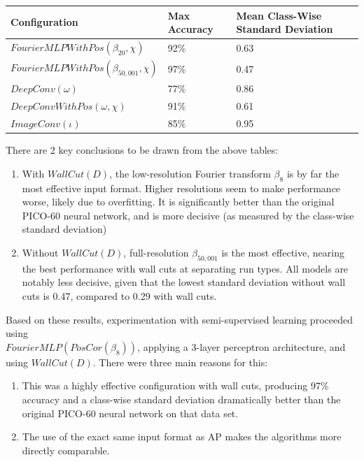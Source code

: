 \documentclass[10pt]{article}
\begin{document}
\begin{minipage}{\textwidth}
    \begin{center}
        \begin{tabular}{|l|l|l|}
            \hline
            Configuration & Max Accuracy & Mean Class-Wise Standard Deviation \\
            \hline
            $FourierMLPWithPos(\beta_{20}, \chi)$ & 92\% & 0.63 \\
            \hline
            $FourierMLPWithPos(\beta_{50,001}, \chi)$ & 97\% & 0.47 \\
            \hline
            $DeepConv(\omega)$ & 77\% & 0.86 \\
            \hline
            $DeepConvWithPos(\omega, \chi)$ & 91\% & 0.61 \\
            \hline
            $ImageConv(\iota)$ & 85\% & 0.95 \\
            \hline
        \end{tabular}
    \end{center}
\end{minipage}

There are 2 key conclusions to be drawn from the above tables:

\begin{enumerate}
    \item With $WallCut(D)$, the low-resolution Fourier transform $\beta_{8}$ is by far the most effective input format. Higher resolutions seem to make performance worse, likely due to overfitting. It is significantly better than the original PICO-60 neural network, and is more decisive (as measured by the class-wise standard deviation)
    \item Without $WallCut(D)$, full-resolution $\beta_{50,001}$ is the most effective, nearing the best performance with wall cuts at separating run types. All models are notably less decisive, given that the lowest standard deviation without wall cuts is 0.47, compared to 0.29 with wall cuts.
\end{enumerate}

Based on these results, experimentation with semi-supervised learning proceeded using \\ $FourierMLP(PosCor(\beta_{8}))$, applying a 3-layer perceptron architecture, and using $WallCut(D)$. There were three main reasons for this:

\begin{enumerate}
    \item This was a highly effective configuration with wall cuts, producing 97\% accuracy and a class-wise standard deviation dramatically better than the original PICO-60 neural network on that data set.
    \item The use of the exact same input format as AP makes the algorithms more directly comparable.
\end{enumerate}
\end{document}
